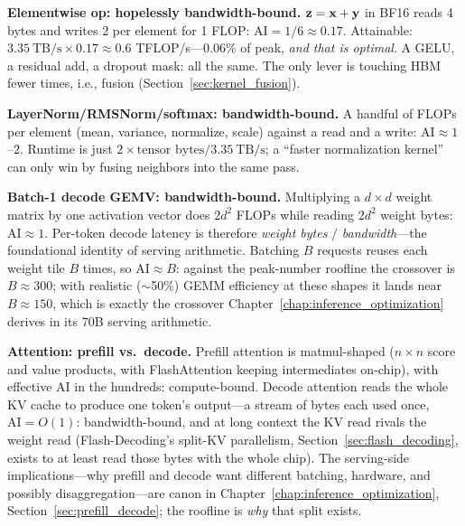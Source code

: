 \textbf{Elementwise op: hopelessly bandwidth-bound.} $\mathbf{z} = \mathbf{x} + \mathbf{y}$ in BF16 reads 4 bytes and writes 2 per element for 1 FLOP: $\text{AI} = 1/6 \approx 0.17$. Attainable: $3.35\ \text{TB/s} \times 0.17 \approx 0.6$ TFLOP/s---0.06\% of peak, \textit{and that is optimal}. A GELU, a residual add, a dropout mask: all the same. The only lever is touching HBM fewer times, i.e., fusion (Section~\ref{sec:kernel_fusion}).

\textbf{LayerNorm/RMSNorm/softmax: bandwidth-bound.} A handful of FLOPs per element (mean, variance, normalize, scale) against a read and a write: $\text{AI} \approx 1$--$2$. Runtime is just $2 \times \text{tensor bytes} / 3.35\ \text{TB/s}$; a ``faster normalization kernel'' can only win by fusing neighbors into the same pass.

\textbf{Batch-1 decode GEMV: bandwidth-bound.} Multiplying a $d{\times}d$ weight matrix by one activation vector does $2d^2$ FLOPs while reading $2d^2$ weight bytes: $\text{AI} \approx 1$. Per-token decode latency is therefore \textit{weight bytes} $/$ \textit{bandwidth}---the foundational identity of serving arithmetic. Batching $B$ requests reuses each weight tile $B$ times, so $\text{AI} \approx B$: against the peak-number roofline the crossover is $B \approx 300$; with realistic ($\sim$50\%) GEMM efficiency at these shapes it lands near $B \approx 150$, which is exactly the crossover Chapter~\ref{chap:inference_optimization} derives in its 70B serving arithmetic.

\textbf{Attention: prefill vs.\ decode.} Prefill attention is matmul-shaped ($n \times n$ score and value products, with FlashAttention keeping intermediates on-chip), with effective AI in the hundreds: compute-bound. Decode attention reads the whole KV cache to produce one token's output---a stream of bytes each used once, $\text{AI} = O(1)$: bandwidth-bound, and at long context the KV read rivals the weight read (Flash-Decoding's split-KV parallelism, Section~\ref{sec:flash_decoding}, exists to at least read those bytes with the whole chip). The serving-side implications---why prefill and decode want different batching, hardware, and possibly disaggregation---are canon in Chapter~\ref{chap:inference_optimization}, Section~\ref{sec:prefill_decode}; the roofline is \textit{why} that split exists.

